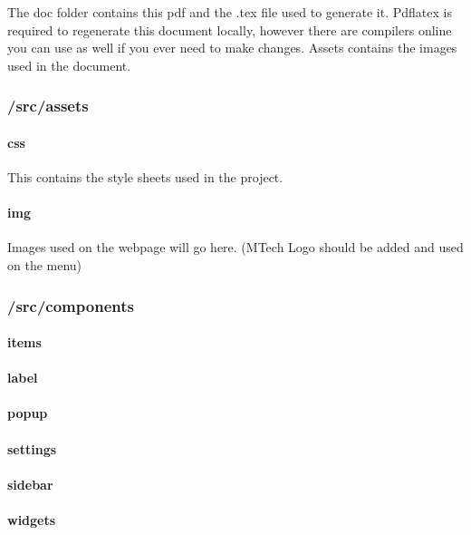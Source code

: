 \documentclass[12pt, titlepage]{article}
\begin{document}
The doc folder contains this pdf and the .tex file used to generate it. Pdflatex is required to regenerate this document locally, however there are compilers online you can use as well if you ever need to make changes. Assets contains the images used in the document.

\subsubsection{/src/assets}
    \paragraph{css}
    This contains the style sheets used in the project.
    \paragraph{img}
    Images used on the webpage will go here. (MTech Logo should be added and used on the menu)

\subsubsection{/src/components}
    \paragraph{items}

    \paragraph{label}

    \paragraph{popup}

    \paragraph{settings}

    \paragraph{sidebar}

    \paragraph{widgets}
\end{document}
